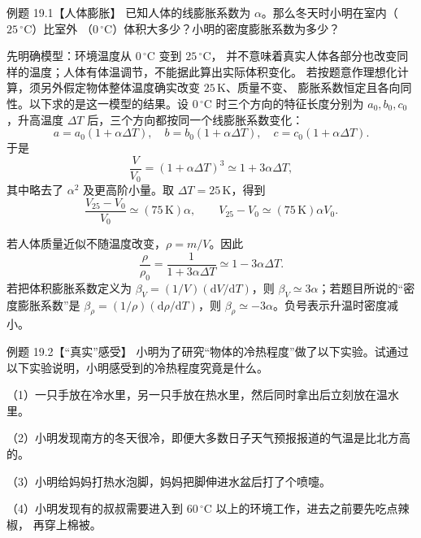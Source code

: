 \begin{origexamplebox}{例题 19.1【人体膨胀】}
已知人体的线膨胀系数为 $\alpha$。那么冬天时小明在室内（$25\,{}^\circ\mathrm C$）比室外
（$0\,{}^\circ\mathrm C$）体积大多少？小明的密度膨胀系数为多少？
\end{origexamplebox}

\begin{xesolution}
先明确模型：环境温度从 $0\,{}^\circ\mathrm C$ 变到 $25\,{}^\circ\mathrm C$，
并不意味着真实人体各部分也改变同样的温度；人体有体温调节，不能据此算出实际体积变化。
若按题意作理想化计算，须另外假定物体整体温度确实改变 $25\,\mathrm K$、质量不变、
膨胀系数恒定且各向同性。以下求的是这一模型的结果。设 $0\,{}^\circ\mathrm C$ 时三个方向的特征长度分别为
$a_0,b_0,c_0$，升高温度 $\Delta T$ 后，三个方向都按同一个线膨胀系数变化：
\begin{equation}
  a=a_0(1+\alpha\Delta T),\quad
  b=b_0(1+\alpha\Delta T),\quad
  c=c_0(1+\alpha\Delta T).
\end{equation}
于是
\begin{equation}
  \frac{V}{V_0}=(1+\alpha\Delta T)^3
  \simeq 1+3\alpha\Delta T,
\end{equation}
其中略去了 $\alpha^2$ 及更高阶小量。取 $\Delta T=25\,\mathrm K$，得到
\begin{equation}
  \boxed{\frac{V_{25}-V_0}{V_0}\simeq(75\,\mathrm K)\alpha},
  \qquad
  \boxed{V_{25}-V_0\simeq(75\,\mathrm K)\alpha V_0}.
\end{equation}

若人体质量近似不随温度改变，$\rho=m/V$。因此
\begin{equation}
  \frac{\rho}{\rho_0}=\frac{1}{1+3\alpha\Delta T}
  \simeq1-3\alpha\Delta T.
\end{equation}
若把体积膨胀系数定义为 $\beta_V=(1/V)(\mathrm dV/\mathrm dT)$，则
$\boxed{\beta_V\simeq3\alpha}$；若题目所说的“密度膨胀系数”是
$\beta_\rho=(1/\rho)(\mathrm d\rho/\mathrm dT)$，则
$\boxed{\beta_\rho\simeq-3\alpha}$。负号表示升温时密度减小。
\end{xesolution}

\begin{origexamplebox}{例题 19.2【“真实”感受】}
小明为了研究“物体的冷热程度”做了以下实验。试通过以下实验说明，小明感受到的冷热程度究竟是什么。

（1）一只手放在冷水里，另一只手放在热水里，然后同时拿出后立刻放在温水里。

（2）小明发现南方的冬天很冷，即便大多数日子天气预报报道的气温是比北方高的。

（3）小明给妈妈打热水泡脚，妈妈把脚伸进水盆后打了个喷嚏。

（4）小明发现有的叔叔需要进入到 $60\,{}^\circ\mathrm C$ 以上的环境工作，进去之前要先吃点辣椒，
再穿上棉被。
\end{origexamplebox}

